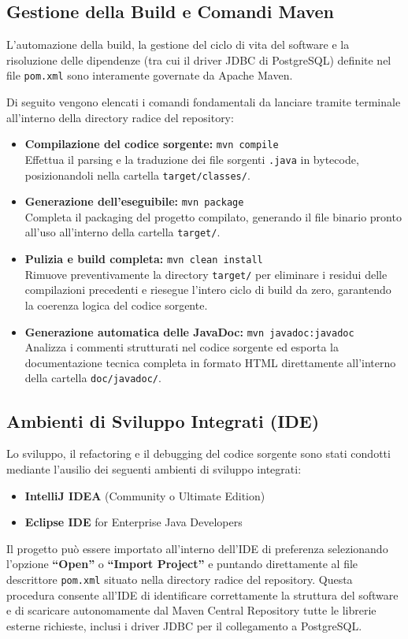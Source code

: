 \documentclass[12pt, a4paper]{article}
\begin{document}
\subsection{Gestione della Build e Comandi Maven}
L'automazione della build, la gestione del ciclo di vita del software e la risoluzione delle dipendenze (tra cui il driver JDBC di PostgreSQL) definite nel file \texttt{pom.xml} sono interamente governate da Apache Maven. 

Di seguito vengono elencati i comandi fondamentali da lanciare tramite terminale all'interno della directory radice del repository:
\begin{itemize}
    \item \textbf{Compilazione del codice sorgente:} \texttt{mvn compile} \\ Effettua il parsing e la traduzione dei file sorgenti \texttt{.java} in bytecode, posizionandoli nella cartella \texttt{target/classes/}.
    \item \textbf{Generazione dell'eseguibile:} \texttt{mvn package} \\ Completa il packaging del progetto compilato, generando il file binario pronto all'uso all'interno della cartella \texttt{target/}.
    \item \textbf{Pulizia e build completa:} \texttt{mvn clean install} \\ Rimuove preventivamente la directory \texttt{target/} per eliminare i residui delle compilazioni precedenti e riesegue l'intero ciclo di build da zero, garantendo la coerenza logica del codice sorgente.
    \item \textbf{Generazione automatica delle JavaDoc:} \texttt{mvn javadoc:javadoc} \\ Analizza i commenti strutturati nel codice sorgente ed esporta la documentazione tecnica completa in formato HTML direttamente all'interno della cartella \texttt{doc/javadoc/}.
\end{itemize}

\subsection{Ambienti di Sviluppo Integrati (IDE)}
Lo sviluppo, il refactoring e il debugging del codice sorgente sono stati condotti mediante l'ausilio dei seguenti ambienti di sviluppo integrati:
\begin{itemize}
    \item \textbf{IntelliJ IDEA} (Community o Ultimate Edition)
    \item \textbf{Eclipse IDE} for Enterprise Java Developers
\end{itemize}
Il progetto può essere importato all'interno dell'IDE di preferenza selezionando l'opzione \textbf{``Open''} o \textbf{``Import Project''} e puntando direttamente al file descrittore \texttt{pom.xml} situato nella directory radice del repository. Questa procedura consente all'IDE di identificare correttamente la struttura del software e di scaricare autonomamente dal Maven Central Repository tutte le librerie esterne richieste, inclusi i driver JDBC per il collegamento a PostgreSQL.
\end{document}
